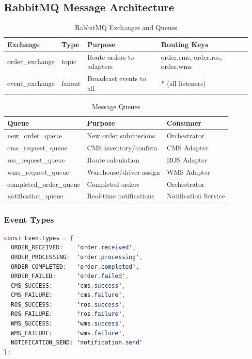 \documentclass[12pt,a4paper]{article}
\begin{document}
\subsection{RabbitMQ Message Architecture}

\begin{table}[H]
\centering
\caption{RabbitMQ Exchanges and Queues}
\begin{tabularx}{\textwidth}{llXl}
\toprule
\textbf{Exchange} & \textbf{Type} & \textbf{Purpose} & \textbf{Routing Keys} \\
\midrule
order\_exchange & topic & Route orders to adapters & order.cms, order.ros, order.wms \\
event\_exchange & fanout & Broadcast events to all & * (all listeners) \\
\bottomrule
\end{tabularx}
\end{table}

\begin{table}[H]
\centering
\caption{Message Queues}
\begin{tabularx}{\textwidth}{lXl}
\toprule
\textbf{Queue} & \textbf{Purpose} & \textbf{Consumer} \\
\midrule
new\_order\_queue & New order submissions & Orchestrator \\
cms\_request\_queue & CMS inventory/confirm & CMS Adapter \\
ros\_request\_queue & Route calculation & ROS Adapter \\
wms\_request\_queue & Warehouse/driver assign & WMS Adapter \\
completed\_order\_queue & Completed orders & Orchestrator \\
notification\_queue & Real-time notifications & Notification Service \\
\bottomrule
\end{tabularx}
\end{table}

\subsubsection{Event Types}

\begin{lstlisting}[language=java, caption={Event Type Definitions}]
const EventTypes = {
  ORDER_RECEIVED:    'order.received',
  ORDER_PROCESSING:  'order.processing',
  ORDER_COMPLETED:   'order.completed',
  ORDER_FAILED:      'order.failed',
  CMS_SUCCESS:       'cms.success',
  CMS_FAILURE:       'cms.failure',
  ROS_SUCCESS:       'ros.success',
  ROS_FAILURE:       'ros.failure',
  WMS_SUCCESS:       'wms.success',
  WMS_FAILURE:       'wms.failure',
  NOTIFICATION_SEND: 'notification.send'
};
\end{lstlisting}
\end{document}

